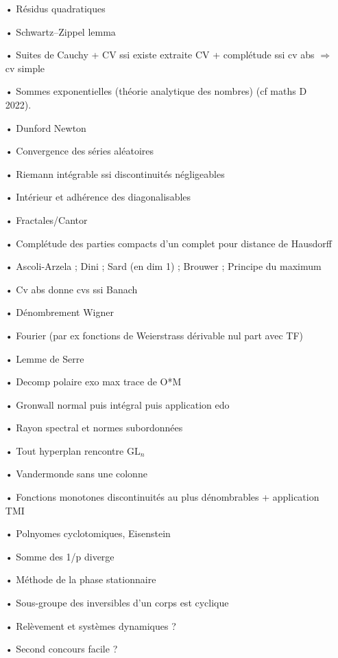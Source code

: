\documentclass[11pt,a4paper]{article}
\begin{document}
\begin{itemize}
\item[•] Résidus quadratiques
\item[•] Schwartz–Zippel lemma
\item[•] Suites de Cauchy + CV ssi existe extraite CV + complétude ssi cv abs $\Rightarrow$ cv simple 
\item[•] Sommes exponentielles (théorie analytique des nombres) (cf maths D 2022).
\item[•] Dunford Newton
\item[•] Convergence des séries aléatoires
\item[•] Riemann intégrable ssi discontinuités négligeables
\item[•] Intérieur et adhérence des diagonalisables
\item[•] Fractales/Cantor
\item[•] Complétude des parties compacts d'un complet pour distance de Hausdorff
\item[•] Ascoli-Arzela ; Dini ; Sard (en dim 1) ; Brouwer ; Principe du maximum
\item[•] Cv abs donne cvs ssi Banach
\item[•] Dénombrement Wigner
\item[•] Fourier (par ex fonctions de Weierstrass dérivable nul part avec TF)
\item[•] Lemme de Serre
\item[•] Decomp polaire exo max trace de O*M
\item[•] Gronwall normal puis intégral puis application edo
\item[•] Rayon spectral et normes subordonnées
\item[•] Tout hyperplan rencontre $\text{GL}_n$
\item[•] Vandermonde sans une colonne
\item[•] Fonctions monotones discontinuités au plus dénombrables + application TMI
\item[•] Polnyomes cyclotomiques, Eisenstein
\item[•] Somme des 1/p diverge
\item[•] Méthode de la phase stationnaire
\item[•] Sous-groupe des inversibles d'un corps est cyclique
\item[•] Relèvement et systèmes dynamiques ?
\item[•] Second concours facile ?
\end{itemize}
\end{document}
